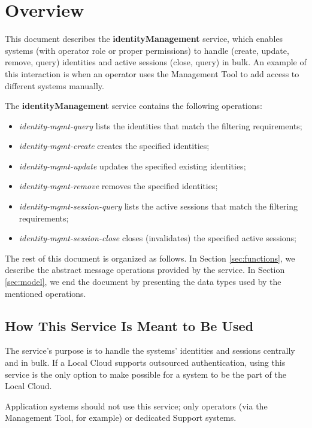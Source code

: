 \documentclass[a4paper]{arrowhead}
\begin{document}
\section{Overview}
\label{sec:overview}
This document describes the \textbf{identityManagement} service, which enables systems (with operator role or proper permissions) to handle (create, update, remove, query) identities and active sessions (close, query) in bulk. An example of this interaction is when an operator uses the Management Tool to add access to different systems manually.

The \textbf{identityManagement} service contains the following operations:

\begin{itemize}
    \item \textit{identity-mgmt-query} lists the identities that match the filtering requirements;
    \item \textit{identity-mgmt-create} creates the specified identities;
    \item \textit{identity-mgmt-update} updates the specified existing identities;
    \item \textit{identity-mgmt-remove} removes the specified identities;
    \item \textit{identity-mgmt-session-query} lists the active sessions that match the filtering requirements;
    \item \textit{identity-mgmt-session-close} closes (invalidates) the specified active sessions;
\end{itemize}

The rest of this document is organized as follows.
In Section \ref{sec:functions}, we describe the abstract message operations provided by the service.
In Section \ref{sec:model}, we end the document by presenting the data types used by the mentioned operations.

\subsection{How This Service Is Meant to Be Used}
The service's purpose is to handle the systems' identities and sessions centrally and in bulk. If a Local Cloud supports outsourced authentication, using this service is the only option to make possible for a system to be the part of the Local Cloud.

Application systems should not use this service; only operators (via the Management Tool, for example) or dedicated Support systems.
\end{document}
